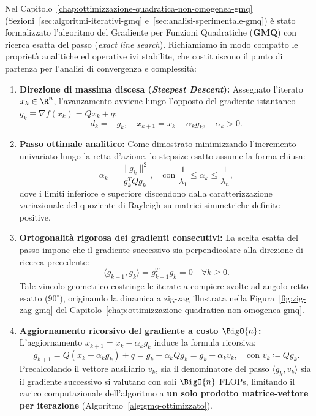 Nel Capitolo~\ref{chap:ottimizzazione-quadratica-non-omogenea-gmq} (Sezioni~\ref{sec:algoritmi-iterativi-gmq} e~\ref{sec:analisi-sperimentale-gmq}) \`e stato formalizzato l'algoritmo del Gradiente per Funzioni Quadratiche (\textbf{GMQ}) con ricerca esatta del passo (\textit{exact line search}). Richiamiamo in modo compatto le propriet\`a analitiche ed operative ivi stabilite, che costituiscono il punto di partenza per l'analisi di convergenza e complessit\`a:
\begin{enumerate}
    \item \textbf{Direzione di massima discesa (\textit{Steepest Descent}):} Assegnato l'iterato $x_k \in \R^n$, l'avanzamento avviene lungo l'opposto del gradiente istantaneo $g_k \equiv \nabla f(x_k) = Q x_k + q$:
    \begin{equation}
        d_k = -g_k, \quad x_{k+1} = x_k - \alpha_k g_k, \quad \alpha_k > 0.
    \end{equation}
    \item \textbf{Passo ottimale analitico:} Come dimostrato minimizzando l'incremento univariato lungo la retta d'azione, lo stepsize esatto assume la forma chiusa:
    \begin{equation}
        \alpha_k = \frac{\|g_k\|^2}{g_k^T Q g_k}, \quad \text{con } \frac{1}{\lambda_1} \le \alpha_k \le \frac{1}{\lambda_n},
        \label{eq:passo-ottimo-gmq}
    \end{equation}
    dove i limiti inferiore e superiore discendono dalla caratterizzazione variazionale del quoziente di Rayleigh su matrici simmetriche definite positive.
    \item \textbf{Ortogonalit\`a rigorosa dei gradienti consecutivi:} La scelta esatta del passo impone che il gradiente successivo sia perpendicolare alla direzione di ricerca precedente:
    \begin{equation}
        \langle g_{k+1}, g_k \rangle = g_{k+1}^T g_k = 0 \quad \forall k \ge 0.
    \end{equation}
    Tale vincolo geometrico costringe le iterate a compiere svolte ad angolo retto esatto ($90^\circ$), originando la dinamica a zig-zag illustrata nella Figura~\ref{fig:zig-zag-gmq} del Capitolo~\ref{chap:ottimizzazione-quadratica-non-omogenea-gmq}.
    \item \textbf{Aggiornamento ricorsivo del gradiente a costo $\BigO{n}$:} L'aggiornamento $x_{k+1} = x_k - \alpha_k g_k$ induce la formula ricorsiva:
    \begin{equation}
        g_{k+1} = Q(x_k - \alpha_k g_k) + q = g_k - \alpha_k Q g_k = g_k - \alpha_k v_k, \quad \text{con } v_k \coloneqq Q g_k.
        \label{eq:aggiornamento-gradiente}
    \end{equation}
    Precalcolando il vettore ausiliario $v_k$, sia il denominatore del passo $\langle g_k, v_k \rangle$ sia il gradiente successivo si valutano con soli $\BigO{n}$ FLOPs, limitando il carico computazionale dell'algoritmo a \textbf{un solo prodotto matrice-vettore per iterazione} (Algoritmo~\ref{alg:gmq-ottimizzato}).
\end{enumerate}


